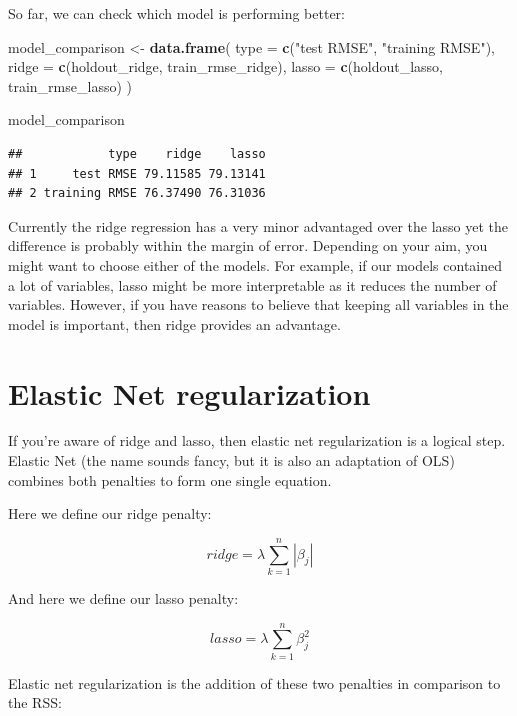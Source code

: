 \documentclass[
]{book}
\newenvironment{Shaded}{\begin{snugshade}}{\end{snugshade}}
\newcommand{\DataTypeTok}[1]{\textcolor[rgb]{0.13,0.29,0.53}{#1}}
\newcommand{\KeywordTok}[1]{\textcolor[rgb]{0.13,0.29,0.53}{\textbf{#1}}}
\newcommand{\NormalTok}[1]{#1}
\newcommand{\StringTok}[1]{\textcolor[rgb]{0.31,0.60,0.02}{#1}}
\begin{document}
So far, we can check which model is performing better:

\begin{Shaded}
\begin{Highlighting}[]
\NormalTok{model_comparison <-}
\StringTok{  }\KeywordTok{data.frame}\NormalTok{(}
    \DataTypeTok{type =} \KeywordTok{c}\NormalTok{(}\StringTok{"test RMSE"}\NormalTok{, }\StringTok{"training RMSE"}\NormalTok{),}
    \DataTypeTok{ridge =} \KeywordTok{c}\NormalTok{(holdout_ridge, train_rmse_ridge),}
    \DataTypeTok{lasso =} \KeywordTok{c}\NormalTok{(holdout_lasso, train_rmse_lasso)}
\NormalTok{  )}

\NormalTok{model_comparison}
\end{Highlighting}
\end{Shaded}

\begin{verbatim}
##            type    ridge    lasso
## 1     test RMSE 79.11585 79.13141
## 2 training RMSE 76.37490 76.31036
\end{verbatim}

Currently the ridge regression has a very minor advantaged over the lasso yet the difference is probably within the margin of error. Depending on your aim, you might want to choose either of the models. For example, if our models contained a lot of variables, lasso might be more interpretable as it reduces the number of variables. However, if you have reasons to believe that keeping all variables in the model is important, then ridge provides an advantage.

\hypertarget{elastic-net-regularization}{%
\section{Elastic Net regularization}\label{elastic-net-regularization}}

If you're aware of ridge and lasso, then elastic net regularization is a logical step. Elastic Net (the name sounds fancy, but it is also an adaptation of OLS) combines both penalties to form one single equation.

Here we define our ridge penalty:

\[ridge = \lambda \sum_{k = 1}^n |\beta_j|\]

And here we define our lasso penalty:

\[lasso = \lambda \sum_{k = 1}^n \beta_j^2\]

Elastic net regularization is the addition of these two penalties in comparison to the RSS:
\end{document}
